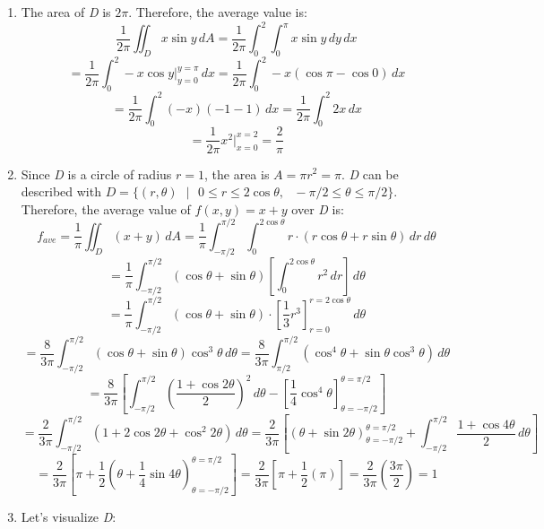 \begin{Answer}[ref = avg]
\begin{enumerate}
\item The area of \textit{D} is $2\pi$. Therefore, the average value is:
$$\frac{1}{2\pi} \iint_{\textit{D}} x\sin{y}\,dA = \frac{1}{2\pi} \int_0^2 
\int_{0}^{\pi} x\sin{y}\,dy\,dx$$
$$= \frac{1}{2\pi} \int_0^2 -x\cos{y}|_{y = 0}^{y = \pi}\,dx = \frac{1}{2\pi} 
\int_0^2 -x \left( \cos{\pi} - \cos{0} \right)\,dx$$
$$= \frac{1}{2\pi} \int_0^2 (-x)(-1 - 1)\,dx = \frac{1}{2\pi} \int_0^2 2x\,dx$$
$$= \frac{1}{2\pi} x^2|_{x = 0}^{x = 2} = \frac{2}{\pi}$$
\item Since \textit{D} is a circle of radius $r = 1$, the area is $A = \pi r^2 
= \pi$. \textit{D} can be described with $\textit{D} = \{ (r, \theta)\text{ }|
\text{ } 0 \leq r \leq 2\cos{\theta},\text{ } -\pi/2 \leq \theta \leq \pi/2\}$.
Therefore, the average value of $f(x, y) = x + y$ over \textit{D} is:
$$f_{ave} = \frac{1}{\pi} \iint_{\textit{D}} \left(x + y \right)\,dA = 
\frac{1}{\pi} \int_{-\pi/2}^{\pi/2} \int_0^{2\cos{\theta}} r \cdot \left(r\cos{
\theta} + r\sin{\theta} \right)\,dr\,d\theta$$
$$= \frac{1}{\pi} \int_{-\pi/2}^{\pi/2} \left(\cos{\theta} + \sin{\theta} 
\right) \left[\int_0^{2\cos{\theta}} r^2 \,dr \right]\,d\theta$$
$$= \frac{1}{\pi} \int_{-\pi/2}^{\pi/2} \left(\cos{\theta} + \sin{\theta} 
\right) \cdot \left[ \frac{1}{3} r^3 \right]_{r = 0}^{r = 2\cos{\theta}}\,d
\theta$$
$$= \frac{8}{3\pi} \int_{-\pi/2}^{\pi/2} \left(\cos{\theta} + \sin{\theta} 
\right) \cos^3{\theta}\,d\theta = \frac{8}{3\pi} \int_{\pi/2}^{\pi/2} \left( 
\cos^4{\theta} + \sin{\theta} \cos^3{\theta} \right)\,d\theta$$
$$= \frac{8}{3\pi} \left[ \int_{-\pi/2}^{\pi/2} \left( \frac{1 + \cos{2
\theta}}{2} \right)^2\,d\theta - \left[ \frac{1}{4} \cos^4{\theta} \right]_{
\theta = -\pi/2}^{\theta = \pi/2} \right]$$
$$= \frac{2}{3\pi} \int_{-\pi/2}^{\pi/2} \left(1 + 2\cos{2\theta} + \cos^2{2
\theta} \right)\,d\theta = \frac{2}{3\pi} \left[ \left(\theta + \sin{2\theta} 
\right)_{\theta = -\pi/2}^{\theta = \pi/2} + \int_{-\pi/2}^{\pi/2} \frac{1 + 
\cos{4\theta}}{2}\,d\theta \right]$$
$$= \frac{2}{3\pi} \left[ \pi + \frac{1}{2} \left(\theta + \frac{1}{4}\sin{4
\theta} \right)_{\theta = -\pi/2}^{\theta = \pi/2} \right] = \frac{2}{3\pi} 
\left[ \pi + \frac{1}{2} \left( \pi \right) \right] = \frac{2}{3\pi} \left( 
\frac{3\pi}{2} \right) = 1$$
\item Let's visualize \textit{D}:



\end{enumerate}
\end{Answer}
